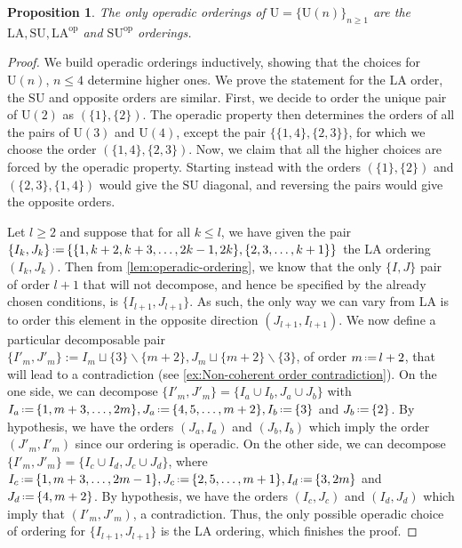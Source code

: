 \documentclass{amsart}
\newtheorem{proposition}[theorem]{Proposition}
\theoremstyle{definition}
\newcommand{\Un}{\mathrm{U}} %
\newcommand{\ssm}{\smallsetminus} %
\newcommand{\eqdef}{\mbox{\,\raisebox{0.2ex}{\scriptsize\ensuremath{\mathrm:}}\ensuremath{=}\,}} %
\newcommand{\SU}{\mathrm{SU}}
\newcommand{\LA}{\mathrm{LA}}
\newcommand{\op}{\mathrm{op}}
\begin{document}
\begin{proposition}
\label{prop:operadic-ordering}
The only operadic orderings of $\Un=\{\Un(n)\}_{n\geq 1}$ are the $\LA,\SU,\LA^{\op}$ and $\SU^{\op}$ orderings.
\end{proposition}

\begin{proof}
We build operadic orderings inductively, showing that the choices for $\Un(n)$, $n\leq 4$ determine higher ones. 
We prove the statement for the $\LA$ order, the $\SU$ and opposite orders are similar. 
First, we decide to order the unique pair of $\Un(2)$ as $(\{1\},\{2\})$.
The operadic property then determines the orders of all the pairs of $\Un(3)$ and $\Un(4)$, except the pair $\{\{1,4\},\{2,3\}\}$, for which we choose the order $(\{1,4\},\{2,3\})$.
Now, we claim that all the higher choices are forced by the operadic property. 
Starting instead with the orders $(\{1\},\{2\})$ and $(\{2,3\},\{1,4\})$ would give the $\SU$ diagonal, and reversing the pairs would give the opposite orders. 

Let $l\geq 2$ and suppose that for all $k\leq l$, we have given the pair $\{I_k,J_k\} \eqdef \{\{1,k+2,k+3,\dots,2k-1,2k\},\{2,3,\dots,k+1\}\}$ the $\LA$ ordering $(I_k,J_k)$.
Then from \cref{lem:operadic-ordering}, we know that the only $\{I,J\}$ pair of order $l+1$ that will not decompose, and hence be specified by the already chosen conditions, is $\{I_{l+1},J_{l+1}\}$.
As such, the only way we can vary from $\LA$ is to order this element in the opposite direction $(J_{l+1},I_{l+1})$. 
We now define a particular decomposable pair $\{I'_m,J'_m\}:= I_m \sqcup \{3\} \ssm \{m+2\}, J_m \sqcup \{m+2\} \ssm \{3\}$, of order $m \eqdef l+2$, that will lead to a contradiction (see \cref{ex:Non-coherent order contradiction}).
On the one side, we can decompose $\{I'_m,J'_m\} = \{I_a \cup I_b, J_a \cup J_b\}$ with $I_a \eqdef  \{1,m+3,\dots,2m\}, J_a \eqdef  \{4,5,\dots,m+2\}, I_b \eqdef \{3\}$ and $J_b \eqdef  \{2\}$. 
By hypothesis, we have the orders $(J_a,I_a)$ and $(J_b,I_b)$ which imply the order $(J'_m,I'_m)$ since our ordering is operadic. 
On the other side, we can decompose $\{I'_m,J'_m\} = \{I_c \cup I_d, J_c \cup J_d\}$, where $I_c \eqdef  \{1,m+3,\dots,  2m-1\}, J_c \eqdef \{2,5,\dots,m+1\}, I_d \eqdef \{3, 2m\}$ and $J_d \eqdef  \{4, m+2\}$.
By hypothesis, we have the orders $(I_c,J_c)$ and $(I_d,J_d)$ which imply that $(I'_m,J'_m)$, a contradiction.
Thus, the only possible operadic choice of ordering for $\{I_{l+1},J_{l+1}\}$ is the $\LA$ ordering, which finishes the proof. 
\end{proof}
\end{document}
